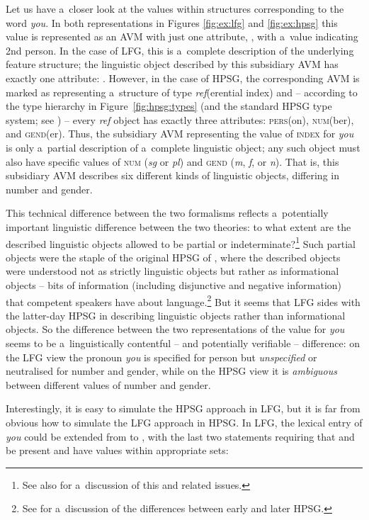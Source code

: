 \documentclass[output=paper,hidelinks]{langscibook}
\begin{document}
Let us have a~closer look at the \NINDEX values within structures corresponding to the word \emph{you}.  In both representations in Figures \ref{fig:ex:lfg} and \ref{fig:ex:hpsg} this value is represented as an AVM with just one attribute, \PERS, with a~value indicating 2nd person.  In the case of LFG, this is a~complete description of the underlying feature structure; the linguistic object described by this subsidiary AVM has exactly one attribute: \PERS.  However, in the case of HPSG, the corresponding AVM is marked as representing a~structure of type \textit{ref}(erential index) and -- according to the type hierarchy in Figure~\ref{fig:hpsg:types} (and the standard HPSG type system; see \citealt[399]{pollard1994head-driven}) -- every \textit{ref} object has exactly three attributes: \textsc{pers}(on), \textsc{num}(ber), and \textsc{gend}(er).  Thus, the subsidiary AVM representing the value of \textsc{index} for \emph{you} is only a~partial description of a~complete linguistic object; any such object must also have specific values of \textsc{num} (\textit{sg} or \textit{pl}) and \textsc{gend} (\textit{m}, \textit{f}, or \textit{n}).  That is, this subsidiary AVM describes six different kinds of linguistic objects, differing in number and gender.

This technical difference between the two formalisms reflects a~potentially important linguistic difference between the two theories: to what extent are the described linguistic objects allowed to be partial or indeterminate?\footnote{See also \citet{kaplan18} for a~discussion of this and related issues.}  Such partial objects were the staple of the original HPSG of \citet{pollardsag87}, where the described objects were understood not as strictly linguistic objects but rather as informational objects -- bits of information (including disjunctive and negative information) that competent speakers have about language.\footnote{See \citet[Chapter {2}]{rich:04} for a~discussion of the differences between early and later HPSG.}  But it seems that LFG sides with the latter-day HPSG in describing linguistic objects rather than informational objects.  So the difference between the two representations of the \NINDEX value for \emph{you} seems to be a~linguistically contentful -- and potentially verifiable -- difference: on the LFG view the pronoun \emph{you} is specified for person but \emph{unspecified} or neutralised for number and gender, while on the HPSG view it is \emph{ambiguous} between different values of number and gender.

Interestingly, it is easy to simulate the HPSG approach in LFG, but it is far from obvious how to simulate the LFG approach in HPSG\@.  In LFG, the lexical entry of \emph{you} could be extended from  to , with the last two statements requiring that \NUM and \GEND be present and have values within appropriate sets:
\end{document}
